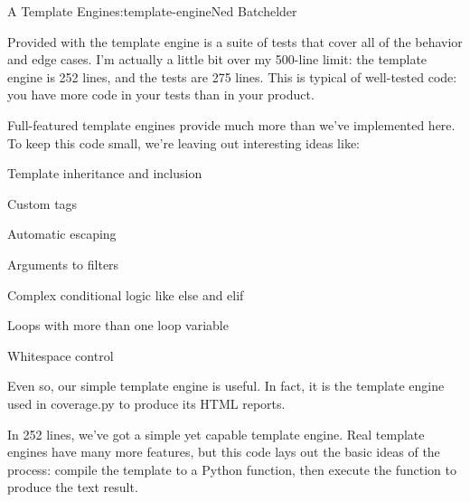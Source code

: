 \begin{aosachapter}{A Template Engine}{s:template-engine}{Ned Batchelder}
\label{testing}

Provided with the template engine is a suite of tests that cover all of
the behavior and edge cases. I'm actually a little bit over my 500-line
limit: the template engine is 252 lines, and the tests are 275 lines.
This is typical of well-tested code: you have more code in your tests
than in your product.

\label{whats-left-out}

Full-featured template engines provide much more than we've implemented
here. To keep this code small, we're leaving out interesting ideas like:

\begin{aosaitemize}

\item
  Template inheritance and inclusion
\item
  Custom tags
\item
  Automatic escaping
\item
  Arguments to filters
\item
  Complex conditional logic like else and elif
\item
  Loops with more than one loop variable
\item
  Whitespace control
\end{aosaitemize}

Even so, our simple template engine is useful. In fact, it is the
template engine used in coverage.py to produce its HTML reports.

\label{summing-up}

In 252 lines, we've got a simple yet capable template engine. Real
template engines have many more features, but this code lays out the
basic ideas of the process: compile the template to a Python function,
then execute the function to produce the text result.

\end{aosachapter}
